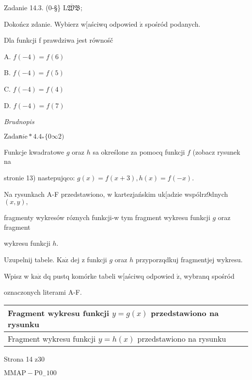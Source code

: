 \documentclass[a4paper,12pt]{article}
\begin{document}
Zadanie 14.3. (0-\S\} $\overline{\mathrm{L}\mathfrak{W}\mathfrak{B}}$;

Dokończ zdanie. Wybierz w[aściwq odpowied $\acute{\mathrm{z}}$ spośród podanych.

Dla funkcji f prawdziwa jest równośč

A. $f(-4)=f(6)$

B. $f(-4)=f(5)$

C. $f(-4)=f(4)$

D. $f(-4)=f(7)$

{\it Brudnopis}

$\mathrm{Z}\mathrm{a}\mathrm{d}\mathrm{a}\mathfrak{n}i\mathrm{e}*4.4_{*}\{0\infty 2)$

Funkcje kwadratowe $g$ oraz $h$ sa określone za pomocq funkcji $f$ (zobacz rysunek na

stronie 13) nastepujqco: $g(x)=f(x+3), h(x)=f(-x).$

Na rysunkach A-F przedstawiono, w kartezjańskim uk[adzie wspólrz9dnych $(x,y),$

fragmenty wykresów róznych funkcji-w tym fragment wykresu funkcji $g$ oraz fragment

wykresu funkcji $h.$

Uzupelnij tabele. $\mathrm{K}\mathrm{a}\dot{\mathrm{z}}$ dej z funkcji $g$ oraz $h$ przyporzqdkuj fragmentjej wykresu.

Wpisz w $\mathrm{k}\mathrm{a}\dot{\mathrm{z}}$ dq pustq komórke tabeli w[aściwq odpowied $\acute{\mathrm{z}}$, wybranq spośród

oznaczonych literami A-F.
\begin{center}
\begin{tabular}{|l|l|}
\hline
\multicolumn{1}{|l|}{Fragment wykresu funkcji $y=g(x)$ przedstawiono na rysunku}&	\multicolumn{1}{|l|}{}	\\
\hline
\multicolumn{1}{|l|}{Fragment wykresu funkcji $y=h(x)$ przedstawiono na rysunku}&	\multicolumn{1}{|l|}{}	\\
\hline
\end{tabular}

\end{center}
Strona 14 z30

$\mathrm{M}\mathrm{M}\mathrm{A}\mathrm{P}-\mathrm{P}0_{-}100$
\end{document}
